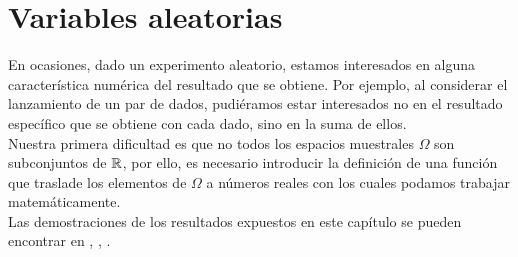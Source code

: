 \section{Variables aleatorias}
En ocasiones, dado un experimento aleatorio, estamos interesados en alguna característica numérica del resultado que se obtiene. Por ejemplo, al considerar el lanzamiento de un par de dados, pudiéramos estar interesados no en el resultado específico que se obtiene con cada dado, sino en la suma de ellos.\\
Nuestra primera dificultad es que no todos los espacios muestrales $\Omega$ son subconjuntos de ${\mathbb{R}}$, por ello, es necesario introducir la definición de una función que traslade los elementos de $\Omega$ a números reales con los cuales podamos trabajar matemáticamente.\\
Las demostraciones de los resultados expuestos en este capítulo se pueden encontrar en \cite{intro-probabilidad}, \cite{Feller},\cite{Rincon1} \cite{Rincon2}.
\begin{comment}
\begin{Def}
El $\sigma-$álgebra de Borel en $\R$ denotado por $\mathscr{B}(\R)$ es
$$\mathscr{B}(\R)=\sigma(\{(a,\thinspace b)\subset\R:a\leq b\})$$
\end{Def}
\begin{Prop}
\textbf{ }\\
\begin{enumerate}
    \item Todo intervalo de $\R$ es un booreliano.
    \item Los subconjuntos cerrados y abiertos de $\R$ son borelianos
\end{enumerate}
\end{Prop}
\begin{Def}
Una función $\phi:\R^n\rightarrow\R^m$ es llamada boreliana si $\phi^{-1}(B)$ es un conjunto boreliano de $R^{-1}$ para todo boreliano B de $\R$.
\end{Def}
Recuérdese que si $\phi:\R^n\rightarrow\R^m$ es cualquier función, se cumple que $\phi^{-1}(B^c)=[\phi^{-1}(B)]^c$
 $\phi^{-1}(\bigcup_{\lambda}B_{\lambda})=\bigcup_{\lambda}\phi^{-1}(B_\lambda)$. Esto
implica que $\{B\subset \R^m: \phi^{-1}(B)\in B(\R^n)\}$ es un $\sigma$-álgebra de subconjuntos de $R^m$ , de manera que, para demostrar que una
cierta función f es boreliana, basta con probar que $\phi^{-1}(B)$ es un conjunto boreliano de $\R^n$ para cualquier elemento B abierto (o cualquier elemento B de una familia de generadores de los borelianos de $\R^m$).
Con base de esta idea, se pueden demostrar las siguientes proposiciones.
\begin{Prop}
$\phi:\R^n\rightarrow\R^m$,  $g:\R^m\rightarrow\R^p$ son borelianos, entonces $g\circ\phi$ es boreliano
\end{Prop}
\begin{Prop} Si $\phi:\R^n\rightarrow\R^m$ es continua, entonces es boreliana.
\end{Prop}
\end{comment}
